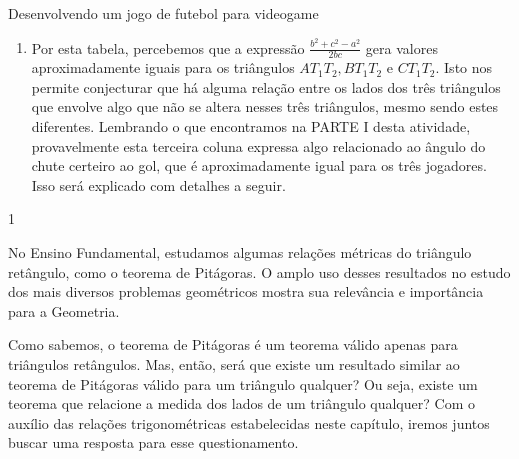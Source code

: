 \begin{answer}{Desenvolvendo um jogo de futebol para videogame}
{\begin{enumerate}
\item{}
Por esta tabela, percebemos que a expressão $\frac{b^2+c^2-a^2}{2bc}$ gera valores aproximadamente iguais para os triângulos $AT_1T_2, BT_1T_2$ e $CT_1T_2$. Isto nos permite conjecturar que há alguma relação entre os lados dos três triângulos que envolve algo que não se altera nesses três triângulos, mesmo sendo estes diferentes. Lembrando o que encontramos na PARTE I desta atividade, provavelmente esta terceira coluna expressa algo relacionado ao ângulo do chute certeiro ao gol, que é aproximadamente igual para os três jogadores. Isso será explicado com detalhes a seguir.
 \end{enumerate}
}{1}
\end{answer}

\label{exp_estendenoteopitagoras}


No Ensino Fundamental, estudamos algumas relações métricas do triângulo retângulo, como o teorema de Pitágoras. 
%
O amplo uso desses resultados no estudo dos mais diversos problemas geométricos mostra sua relevância e importância para a Geometria.

Como sabemos, o teorema de Pitágoras é um teorema válido apenas para triângulos retângulos. 
%
Mas, então, será que existe um resultado similar ao teorema de Pitágoras válido para um triângulo qualquer? 
%
Ou seja, existe um teorema que relacione a medida dos lados de um triângulo qualquer? 
%
Com o auxílio das relações trigonométricas estabelecidas neste capítulo, iremos juntos buscar uma resposta para esse questionamento.


